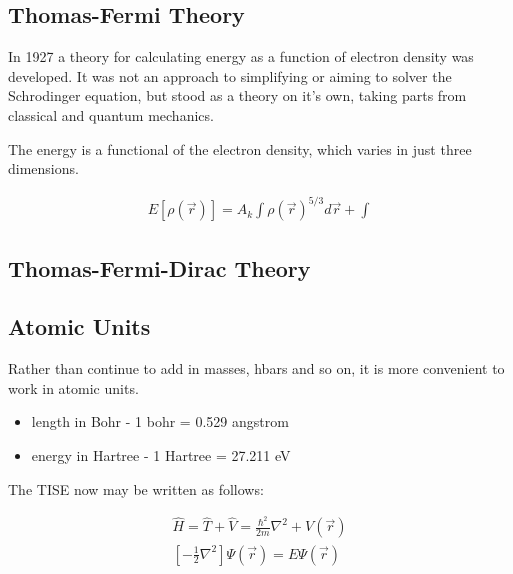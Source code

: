 \subsection{Thomas-Fermi Theory}


In 1927 a theory for calculating energy as a function of electron density was developed.  It was not an approach to simplifying or aiming to solver the Schrodinger equation, but stood as a theory on it's own, taking parts from classical and quantum mechanics.

The energy is a functional of the electron density, which varies in just three dimensions.

\begin{equation}
\begin{split}
E[\rho(\vec{r})] = A_k \int \rho(\vec{r})^{5/3} d\vec{r} + \int
\end{split}
\label{eq:eqThomasFermiEnergy}
\end{equation}




\subsection{Thomas-Fermi-Dirac Theory}





\subsection{Atomic Units}

Rather than continue to add in masses, hbars and so on, it is more convenient to work in atomic units.

\begin{itemize}
\item length in Bohr - 1 bohr = 0.529 angstrom
\item energy in Hartree - 1 Hartree = 27.211 eV
\end{itemize}

The TISE now may be written as follows:

\begin{equation}
\begin{split}
\hat{H} = \hat{T} + \hat{V} = \frac{\hbar^2}{2 m} \nabla^2 + V(\vec{r})\\
\left[-\frac{1}{2} \nabla^2 \right] \Psi(\vec{r}) = E \Psi(\vec{r})
\end{split}
\label{eq:eqTimeIndependentSchrodinger}
\end{equation}




